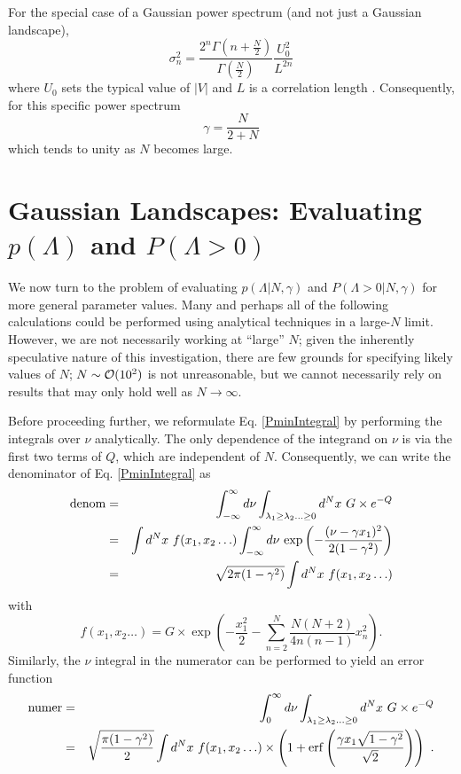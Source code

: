 \documentclass[12pt]{article}
\begin{document}
 For the special case of a Gaussian power spectrum (and not just a Gaussian landscape), 
%
\begin{equation}
\sigma_n^2 = \frac{2^n \Gamma{\left(n+ \frac{N}{2} \right)}}{\Gamma{\left(\frac{N}{2} \right)}} \frac{U_0^2}{L^{2n}}
\end{equation}
%
where $U_0$ sets the typical value of $|V|$ and $L$ is a correlation length \cite{Yamada2018}.  Consequently, for this specific power spectrum 
%
\begin{equation} \label{gammaNgaussian}
\gamma = \frac{N}{2+N}
\end{equation}
which tends to unity as $N$ becomes large.

\section{Gaussian Landscapes: Evaluating $p(\Lambda)$ and $P(\Lambda>0)$} \label{PeakNumbers}

We now turn to the problem of evaluating $p(\Lambda|N,\gamma)$ and $P(\Lambda>0|N,\gamma)$  for more general parameter values. Many and perhaps all of the following calculations could be performed using analytical techniques in a large-$N$ limit. However, we are  not necessarily working at ``large'' $N$; given the inherently speculative nature of this investigation, there are few  grounds for specifying likely values of $N$;  $N\sim{\cal O}(10^2)$ is not unreasonable, but we cannot necessarily rely on results that may only hold well as $N\rightarrow \infty$. 

Before proceeding further, we reformulate Eq. \ref{PminIntegral} by performing the integrals over $\nu$ analytically. The only dependence of the integrand on $\nu$ is via the first two terms of $Q$, which are independent of $N$. Consequently, we can write the denominator of Eq. \ref{PminIntegral} as 
%
\begin{eqnarray}\label{denom}
\nonumber {\rm denom} &=&
\int^\infty_{-\infty} d\nu \int_{\lambda_1 \geq \lambda_2 \ldots \geq 0} d^Nx \,\,G \times e^{-Q} \\ 
\nonumber &=&  \int d^Nx\,\, f(x_1,x_2 \ldots )  \int^\infty_{-\infty} d\nu \,\exp\left(-\frac{(\nu- \gamma x_1)^2}{2(1-\gamma^2)}\right)\\
&=& \sqrt{2\pi (1-\gamma^2)}  \int d^N x \,\, f(x_1,x_2 \ldots )
\end{eqnarray}
%
with
%
\begin{equation*} f(x_1,x_2 \ldots ) =  G\times \exp\left(-\frac{x_1^2}{2}-\sum_{n=2}^N\frac{N(N+2)}{4n(n-1)}x_n^2 \right).
\end{equation*}
% 
Similarly, the $\nu$ integral in the numerator can be performed to yield an error function
%
\begin{eqnarray}\label{numer}
\nonumber {\rm numer} &=&
\int^\infty_{0} d\nu \int_{\lambda_1 \geq \lambda_2 \ldots \geq 0}d^N x\,\, G \times e^{-Q} \\ 
&=& \sqrt{\frac{\pi (1-\gamma^2)}{2}}  \int d^N x \,\, f(x_1,x_2 \ldots )\times \left(1+{\rm erf}\left(\frac{\gamma x_1 \sqrt{1-\gamma^2}}{\sqrt{2}}\right) \right)\,\, .
\end{eqnarray}
\end{document}
